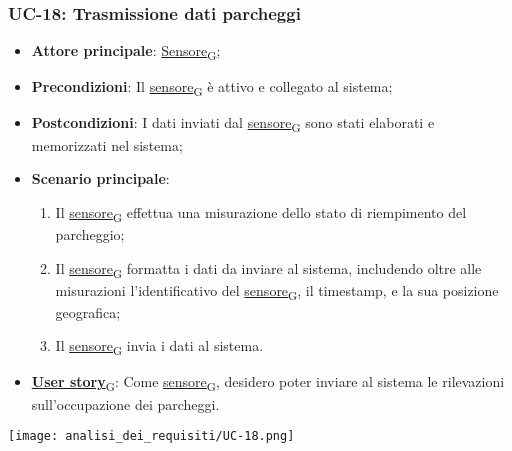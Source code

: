 \subsubsection{UC-18: Trasmissione dati parcheggi}
\begin{itemize}
	\item \textbf{Attore principale}: \href{https://7last.github.io/docs/rtb/documentazione-interna/glossario\#sensore}{Sensore\textsubscript{G}};
	\item \textbf{Precondizioni}: Il \href{https://7last.github.io/docs/rtb/documentazione-interna/glossario\#sensore}{sensore\textsubscript{G}} è attivo e collegato al sistema;
	\item \textbf{Postcondizioni}: I dati inviati dal \href{https://7last.github.io/docs/rtb/documentazione-interna/glossario\#sensore}{sensore\textsubscript{G}} sono stati elaborati e memorizzati nel sistema;
	\item \textbf{Scenario principale}:
	      \begin{enumerate}
		      \item Il \href{https://7last.github.io/docs/rtb/documentazione-interna/glossario\#sensore}{sensore\textsubscript{G}} effettua una misurazione dello stato di riempimento del parcheggio;
		      \item Il \href{https://7last.github.io/docs/rtb/documentazione-interna/glossario\#sensore}{sensore\textsubscript{G}} formatta i dati da inviare al sistema, includendo oltre alle misurazioni l'identificativo del \href{https://7last.github.io/docs/rtb/documentazione-interna/glossario\#sensore}{sensore\textsubscript{G}},
		            il timestamp, e la sua posizione geografica;
		      \item Il \href{https://7last.github.io/docs/rtb/documentazione-interna/glossario\#sensore}{sensore\textsubscript{G}} invia i dati al sistema.
	      \end{enumerate}
	\item \href{https://7last.github.io/docs/rtb/documentazione-interna/glossario\#user-story}{\textbf{User story}\textsubscript{G}}: Come \href{https://7last.github.io/docs/rtb/documentazione-interna/glossario\#sensore}{sensore\textsubscript{G}}, desidero poter inviare al sistema le rilevazioni sull'occupazione dei parcheggi.
\end{itemize}

\begin{center}
	\texttt{[image: analisi\_dei\_requisiti/UC-18.png]}
\end{center}

